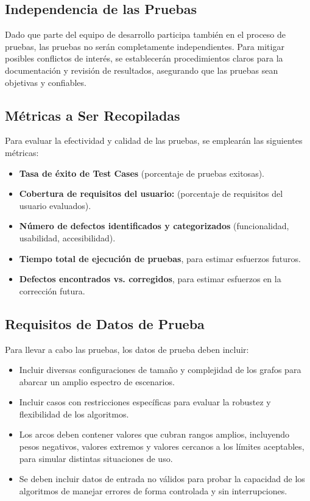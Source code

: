\documentclass[stu, 12pt, letterpaper, donotrepeattitle, floatsintext, natbib]{apa7}
\begin{document}
\subsection{Independencia de las Pruebas}
Dado que parte del equipo de desarrollo participa también en el proceso de pruebas, las pruebas no serán completamente independientes. Para mitigar posibles conflictos de interés, se establecerán procedimientos claros para la documentación y revisión de resultados, asegurando que las pruebas sean objetivas y confiables.

\subsection{Métricas a Ser Recopiladas}
Para evaluar la efectividad y calidad de las pruebas, se emplearán las siguientes métricas:
\begin{itemize}
    \item \textbf{Tasa de éxito de Test Cases} (porcentaje de pruebas exitosas).
    \item \textbf{Cobertura de requisitos del usuario:} (porcentaje de requisitos del usuario evaluados).
    \item \textbf{Número de defectos identificados y categorizados} (funcionalidad, usabilidad, accesibilidad).
    \item \textbf{Tiempo total de ejecución de pruebas}, para estimar esfuerzos futuros.
    \item \textbf{Defectos encontrados vs. corregidos}, para estimar esfuerzos en la corrección futura.

\end{itemize}

\subsection{Requisitos de Datos de Prueba}
Para llevar a cabo las pruebas, los datos de prueba deben incluir:
\begin{itemize}
    \item Incluir diversas configuraciones de tamaño y complejidad de los grafos para abarcar un amplio espectro de escenarios.
    \item Incluir casos con restricciones específicas para evaluar la robustez y flexibilidad de los algoritmos.
    \item Los arcos deben contener valores que cubran rangos amplios, incluyendo pesos negativos, valores extremos y valores cercanos a los límites aceptables, para simular distintas situaciones de uso.
    \item Se deben incluir datos de entrada no válidos para probar la capacidad de los algoritmos de manejar errores de forma controlada y sin interrupciones.
\end{itemize}
\end{document}
